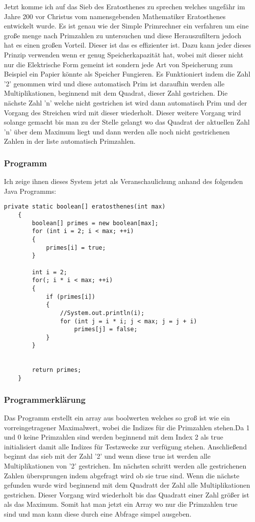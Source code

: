 Jetzt komme ich auf das Sieb des Eratosthenes zu sprechen welches ungefähr im Jahre 200 vor Christus vom namensgebenden Mathematiker Eratosthenes entwickelt wurde. Es ist genau wie der Simple Primrechner ein verfahren um eine große menge nach Primzahlen zu untersuchen und diese Herauszufiltern jedoch hat es einen großen Vorteil. Dieser ist das es effizienter ist. Dazu kann jeder dieses Prinzip verwenden wenn er genug Speicherkapazität hat, wobei mit dieser nicht nur die Elektrische Form gemeint ist sondern jede Art von Speicherung zum Beispiel ein Papier könnte als Speicher Fungieren. Es Funktioniert indem die Zahl '2' genommen wird und diese automatisch Prim ist daraufhin werden alle Multiplikationen, beginnend mit dem Quadrat, dieser Zahl gestrichen. Die nächste Zahl 'n' welche nicht gestrichen ist wird dann automatisch Prim und der Vorgang des Streichen wird mit dieser wiederholt. Dieser weitere Vorgang wird solange gemacht bis man zu der Stelle gelangt wo das Quadrat der aktuellen Zahl 'n' über dem Maximum liegt und dann werden alle noch nicht gestrichenen Zahlen in der liste automatisch Primzahlen.
\subsubsection{Programm}
Ich zeige ihnen dieses System jetzt als Veranschaulichung anhand des folgenden Java Programms:
\lstset{language=Java} 
\begin{lstlisting}[frame=single]
  private static boolean[] eratosthenes(int max)
	{
		boolean[] primes = new boolean[max];
		for (int i = 2; i < max; ++i)
		{
			primes[i] = true;
		}
		
		int i = 2;
		for(; i * i < max; ++i)
		{
			if (primes[i])
			{
				//System.out.println(i);
				for (int j = i * i; j < max; j = j + i)
					primes[j] = false;
			}
		}
		
		
		return primes;
	}
\end{lstlisting}
\newpage
\subsubsection{Programmerklärung}
Das Programm erstellt ein array aus boolwerten welches so groß ist wie ein vorreingetragener Maximalwert, wobei die Indizes für die Primzahlen stehen.Da 1 und 0 keine Primzahlen sind werden beginnend mit dem Index 2 als true initialisiert damit alle Indizes für Testzwecke zur verfügung stehen. Anschließend beginnt das sieb mit der Zahl '2' und wenn diese true ist werden alle Multiplikationen von '2' gestrichen. Im nächsten schritt werden alle gestrichenen Zahlen übersprungen indem abgefragt wird ob sie true sind. Wenn die nächste gefunden wurde wird beginnend mit dem Quadratt der Zahl alle Multiplikationen gestrichen. Dieser Vorgang wird wiederholt bis das Quadratt einer Zahl größer ist als das Maximum. Somit hat man jetzt ein Array wo nur die Primzahlen true sind und man kann diese durch eine Abfrage simpel ausgeben.